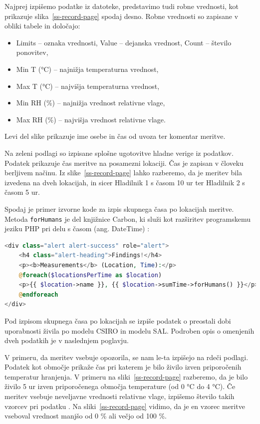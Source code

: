 \documentclass[a4paper, 12pt]{book}
\begin{document}
Najprej izpišemo podatke iz datoteke, predstavimo tudi robne vrednosti, kot prikazuje slika~\ref{ss-record-page} spodaj desno.
Robne vrednosti so zapisane v obliki tabele in določajo:
\begin{itemize}
	\item Limits – oznaka vrednosti, Value – dejanska vrednost, Count – število ponovitev,
	\item Min T (°C) – najnižja temperaturna vrednost,
	\item Max T (°C) – najvišja temperaturna vrednost,
	\item Min RH (\%) – najnižja vrednost relativne vlage,
	\item Max RH (\%) – najvišja vrednost relativne vlage.
\end{itemize}


Levi del slike prikazuje ime osebe in čas od uvoza ter komentar meritve.

Na zeleni podlagi so izpisane splošne ugotovitve hladne verige iz podatkov. Podatek  prikazuje čas meritve na posamezni lokaciji. Čas je zapisan v človeku berljivem načinu. Iz slike~\ref{ss-record-page} lahko razberemo, da je meritev bila izvedena na dveh lokacijah, in sicer Hladilnik 1 s časom 10 ur ter Hladilnik 2 s časom 5 ur. 

Spodaj je primer izvorne kode za izpis skupnega časa po lokacijah meritve. Metoda \verb=forHumans= je del knjižnice Carbon, ki služi kot razširitev programskemu jeziku PHP pri delu s časom (ang. DateTime) \cite{carbon-framework}:

\begin{lstlisting}[language=PHP, style=mystyle]
<div class="alert alert-success" role="alert">
    <h4 class="alert-heading">Findings!</h4>
    <p><b>Measurements</b> (Location, Time):</p>
    @foreach($locationsPerTime as $location)
    <p>{{ $location->name }}, {{ $location->sumTime->forHumans() }}</p>
    @endforeach
</div>
\end{lstlisting}

Pod izpisom skupnega časa po lokacijah se izpiše podatek o preostali dobi uporabnosti živila po modelu CSIRO in modelu SAL. Podroben opis o omenjenih dveh podatkih je v naslednjem poglavju.

V primeru, da meritev vsebuje opozorila, se nam le-ta izpišejo na rdeči podlagi. Podatek  kot območje prikaže čas pri katerem je bilo živilo izven priporočenih temperatur hranjenja. V primeru na sliki~\ref{ss-record-page} razberemo, da je bilo živilo 5 ur izven priporočenega območja temperature (od 0 °C do 4 °C). 
Če meritev vsebuje neveljavne vrednosti relativne vlage, izpišemo število takih vzorcev pri podatku . Na sliki~\ref{ss-record-page} vidimo, da je en vzorec meritve vseboval vrednost manjšo od 0 \% ali večjo od 100 \%.
\end{document}
